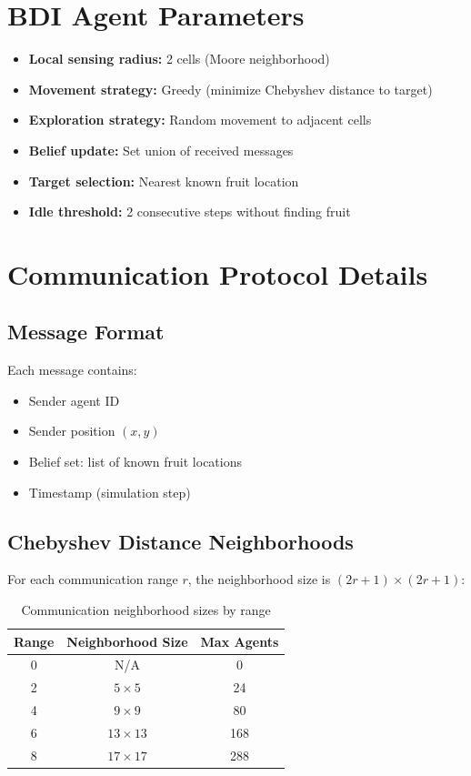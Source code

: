 \section{BDI Agent Parameters}

\begin{itemize}
    \item \textbf{Local sensing radius:} 2 cells (Moore neighborhood)
    \item \textbf{Movement strategy:} Greedy (minimize Chebyshev distance to target)
    \item \textbf{Exploration strategy:} Random movement to adjacent cells
    \item \textbf{Belief update:} Set union of received messages
    \item \textbf{Target selection:} Nearest known fruit location
    \item \textbf{Idle threshold:} 2 consecutive steps without finding fruit
\end{itemize}

\section{Communication Protocol Details}

\subsection{Message Format}

Each message contains:
\begin{itemize}
    \item Sender agent ID
    \item Sender position $(x, y)$
    \item Belief set: list of known fruit locations
    \item Timestamp (simulation step)
\end{itemize}

\subsection{Chebyshev Distance Neighborhoods}

For each communication range $r$, the neighborhood size is $(2r+1) \times (2r+1)$:

\begin{table}[h]
\centering
\small
\caption{Communication neighborhood sizes by range}
\label{tab:neighborhoods}
\begin{tabular}{|c|c|c|}
\hline
\textbf{Range} & \textbf{Neighborhood Size} & \textbf{Max Agents} \\
\hline
0 & N/A & 0 \\
2 & $5 \times 5$ & 24 \\
4 & $9 \times 9$ & 80 \\
6 & $13 \times 13$ & 168 \\
8 & $17 \times 17$ & 288 \\
\hline
\end{tabular}
\end{table}

